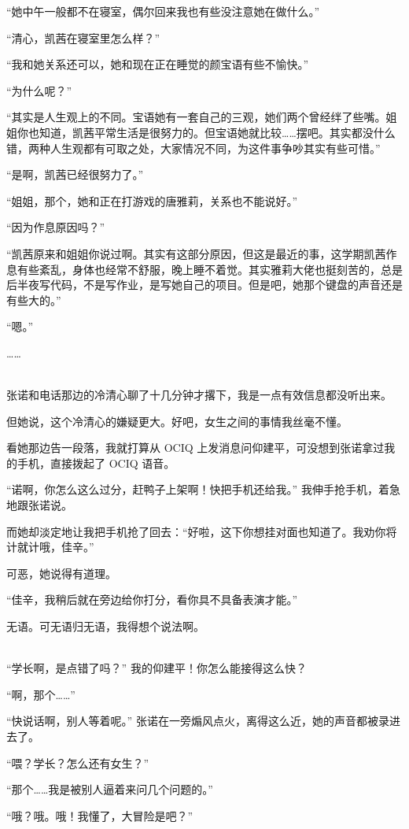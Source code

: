 \documentclass[UTF8]{ctexart}
\begin{document}
“她中午一般都不在寝室，偶尔回来我也有些没注意她在做什么。”

“清心，凯茜在寝室里怎么样？”

“我和她关系还可以，她和现在正在睡觉的颜宝语有些不愉快。”

“为什么呢？”

“其实是人生观上的不同。宝语她有一套自己的三观，她们两个曾经绊了些嘴。姐姐你也知道，凯茜平常生活是很努力的。但宝语她就比较……摆吧。其实都没什么错，两种人生观都有可取之处，大家情况不同，为这件事争吵其实有些可惜。”

“是啊，凯茜已经很努力了。”

“姐姐，那个，她和正在打游戏的唐雅莉，关系也不能说好。”

“因为作息原因吗？”

“凯茜原来和姐姐你说过啊。其实有这部分原因，但这是最近的事，这学期凯茜作息有些紊乱，身体也经常不舒服，晚上睡不着觉。其实雅莉大佬也挺刻苦的，总是后半夜写代码，不是写作业，是写她自己的项目。但是吧，她那个键盘的声音还是有些大的。”

“嗯。”

……

~\\

张诺和电话那边的冷清心聊了十几分钟才撂下，我是一点有效信息都没听出来。

但她说，这个冷清心的嫌疑更大。好吧，女生之间的事情我丝毫不懂。

看她那边告一段落，我就打算从 OCIQ 上发消息问仰建平，可没想到张诺拿过我的手机，直接拨起了 OCIQ 语音。

“诺啊，你怎么这么过分，赶鸭子上架啊！快把手机还给我。” 我伸手抢手机，着急地跟张诺说。

而她却淡定地让我把手机抢了回去：“好啦，这下你想挂对面也知道了。我劝你将计就计哦，佳辛。”

可恶，她说得有道理。

“佳辛，我稍后就在旁边给你打分，看你具不具备表演才能。”

无语。可无语归无语，我得想个说法啊。

~\\

“学长啊，是点错了吗？” 我的仰建平！你怎么能接得这么快？

“啊，那个……”

“快说话啊，别人等着呢。” 张诺在一旁煽风点火，离得这么近，她的声音都被录进去了。

“喂？学长？怎么还有女生？”

“那个……我是被别人逼着来问几个问题的。”

“哦？哦。哦！我懂了，大冒险是吧？”
\end{document}
